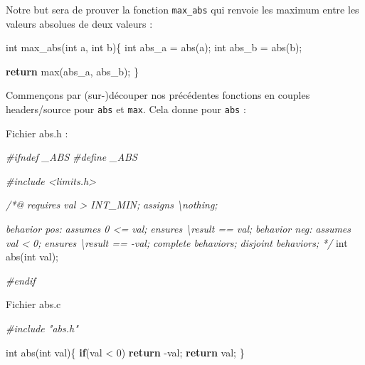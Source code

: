 \documentclass[12pt,francais,]{scrbook}
\newenvironment{Shaded}{}{}
\newcommand{\KeywordTok}[1]{\textcolor[rgb]{0.00,0.44,0.13}{\textbf{{#1}}}}
\newcommand{\DataTypeTok}[1]{\textcolor[rgb]{0.56,0.13,0.00}{{#1}}}
\newcommand{\DecValTok}[1]{\textcolor[rgb]{0.25,0.63,0.44}{{#1}}}
\newcommand{\CommentTok}[1]{\textcolor[rgb]{0.38,0.63,0.69}{\textit{{#1}}}}
\newcommand{\NormalTok}[1]{{#1}}
\begin{document}
Notre but sera de prouver la fonction \texttt{max\_abs} qui renvoie les
maximum entre les valeurs absolues de deux valeurs :

\begin{footnotesize}\begin{Shaded}
\begin{Highlighting}[]
\DataTypeTok{int} \NormalTok{max_abs(}\DataTypeTok{int} \NormalTok{a, }\DataTypeTok{int} \NormalTok{b)\{}
  \DataTypeTok{int} \NormalTok{abs_a = abs(a);}
  \DataTypeTok{int} \NormalTok{abs_b = abs(b);}

  \KeywordTok{return} \NormalTok{max(abs_a, abs_b);}
\NormalTok{\}}
\end{Highlighting}
\end{Shaded}\end{footnotesize}

Commençons par (sur-)découper nos précédentes fonctions en couples
headers/source pour \texttt{abs} et \texttt{max}. Cela donne pour
\texttt{abs} :

Fichier abs.h :

\begin{footnotesize}\begin{Shaded}
\begin{Highlighting}[]
\CommentTok{#ifndef _ABS}
\CommentTok{#define _ABS}

\CommentTok{#include <limits.h>}

\CommentTok{/*@}
\CommentTok{  requires val > INT_MIN;}
\CommentTok{  assigns  \textbackslash{}nothing;}

\CommentTok{  behavior pos:}
\CommentTok{    assumes 0 <= val;}
\CommentTok{    ensures \textbackslash{}result == val;}
\CommentTok{  }
\CommentTok{  behavior neg:}
\CommentTok{    assumes val < 0;}
\CommentTok{    ensures \textbackslash{}result == -val;}
\CommentTok{ }
\CommentTok{  complete behaviors;}
\CommentTok{  disjoint behaviors;}
\CommentTok{*/}
\DataTypeTok{int} \NormalTok{abs(}\DataTypeTok{int} \NormalTok{val);}

\CommentTok{#endif}
\end{Highlighting}
\end{Shaded}\end{footnotesize}

Fichier abs.c

\begin{footnotesize}\begin{Shaded}
\begin{Highlighting}[]
\CommentTok{#include "abs.h"}

\DataTypeTok{int} \NormalTok{abs(}\DataTypeTok{int} \NormalTok{val)\{}
  \KeywordTok{if}\NormalTok{(val < }\DecValTok{0}\NormalTok{) }\KeywordTok{return} \NormalTok{-val;}
  \KeywordTok{return} \NormalTok{val;}
\NormalTok{\}}
\end{Highlighting}
\end{Shaded}\end{footnotesize}
\end{document}
